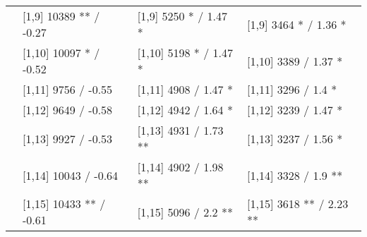 \begin{table}
\begin{tabular}[t]{llll}
 & {}[1,9] 10389 ** / -0.27 & {}[1,9] 5250 * / 1.47 * & {}[1,9] 3464 * / 1.36 *\\
 & {}[1,10] 10097 * / -0.52 & {}[1,10] 5198 * / 1.47 * & {}[1,10] 3389  / 1.37 *\\
 & {}[1,11] 9756  / -0.55 & {}[1,11] 4908  / 1.47 * & {}[1,11] 3296  / 1.4 *\\
 & {}[1,12] 9649  / -0.58 & {}[1,12] 4942  / 1.64 * & {}[1,12] 3239  / 1.47 *\\
\addlinespace
 & {}[1,13] 9927  / -0.53 & {}[1,13] 4931  / 1.73 ** & {}[1,13] 3237  / 1.56 *\\
 & {}[1,14] 10043  / -0.64 & {}[1,14] 4902  / 1.98 ** & {}[1,14] 3328  / 1.9 **\\
 & {}[1,15] 10433 ** / -0.61 & {}[1,15] 5096  / 2.2 ** & {}[1,15] 3618 ** / 2.23 **\\
\bottomrule
\end{tabular}
\end{table}
